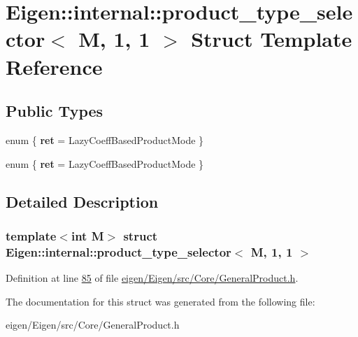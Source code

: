 \hypertarget{struct_eigen_1_1internal_1_1product__type__selector_3_01_m_00_011_00_011_01_4}{}\section{Eigen\+:\+:internal\+:\+:product\+\_\+type\+\_\+selector$<$ M, 1, 1 $>$ Struct Template Reference}
\label{struct_eigen_1_1internal_1_1product__type__selector_3_01_m_00_011_00_011_01_4}
\subsection*{Public Types}
\begin{DoxyCompactItemize}
\item 
\mbox{\label{struct_eigen_1_1internal_1_1product__type__selector_3_01_m_00_011_00_011_01_4_a7ae3ae4c4bca19c03cd891ec0aa50bfd}} 
enum \{ {\bfseries ret} = Lazy\+Coeff\+Based\+Product\+Mode
 \}
\item 
\mbox{\label{struct_eigen_1_1internal_1_1product__type__selector_3_01_m_00_011_00_011_01_4_a7a1d0716ef5e547b3e5e13e1c9fb3c45}} 
enum \{ {\bfseries ret} = Lazy\+Coeff\+Based\+Product\+Mode
 \}
\end{DoxyCompactItemize}


\subsection{Detailed Description}
\subsubsection*{template$<$int M$>$\newline
struct Eigen\+::internal\+::product\+\_\+type\+\_\+selector$<$ M, 1, 1 $>$}



Definition at line \hyperlink{eigen_2_eigen_2src_2_core_2_general_product_8h_source_l00085}{85} of file \hyperlink{eigen_2_eigen_2src_2_core_2_general_product_8h_source}{eigen/\+Eigen/src/\+Core/\+General\+Product.\+h}.



The documentation for this struct was generated from the following file\+:\begin{DoxyCompactItemize}
\item 
eigen/\+Eigen/src/\+Core/\+General\+Product.\+h\end{DoxyCompactItemize}
